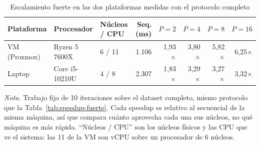 \begin{table}[H]
\caption{Escalamiento fuerte en las dos plataformas medidas con el protocolo completo}\label{tab:plataformas}
\footnotesize
\begin{tabular}{@{}lllrrrrr@{}}
\toprule
\textbf{Plataforma} & \textbf{Procesador} & \textbf{Núcleos / CPU} & \textbf{Seq. (ms)} & \textbf{$P=2$} & \textbf{$P=4$} & \textbf{$P=8$} & \textbf{$P=16$} \\
\midrule
VM (Proxmox) & Ryzen 5 7600X & 6 / 11 & 1.106 & 1,93$\times$ & 3,80$\times$ & 5,82$\times$ & 6,25$\times$ \\
Laptop & Core i5-10210U & 4 / 8 & 2.307 & 1,83$\times$ & 3,29$\times$ & 3,27$\times$ & 3,32$\times$ \\
\bottomrule
\end{tabular}

{\footnotesize\textit{Nota.} Trabajo fijo de 10 iteraciones sobre el dataset completo, mismo protocolo que la Tabla~\ref{tab:speedup-fuerte}. Cada speedup es relativo al secuencial de la misma máquina, así que compara cuánto aprovecha cada una sus núcleos, no qué máquina es más rápida. \enquote{Núcleos / CPU} son los núcleos físicos y las CPU que ve el sistema: las 11 de la VM son vCPU sobre un procesador de 6 núcleos.\par}
\end{table}
